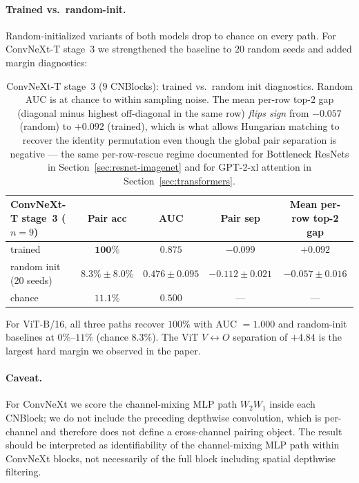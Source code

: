 \documentclass[10pt]{article}
\theoremstyle{remark}
\begin{document}
\paragraph{Trained vs.\ random-init.} Random-initialized variants of both
models drop to chance on every path. For ConvNeXt-T stage~3 we
strengthened the baseline to $20$ random seeds and added margin
diagnostics:

\begin{table}[H]
\centering
\small
\renewcommand{\arraystretch}{1.15}
\begin{tabular}{lcccc}
\toprule
ConvNeXt-T stage~3 ($n{=}9$) & Pair acc & AUC & Pair sep & Mean per-row top-2 gap \\
\midrule
trained                       & $\mathbf{100\%}$ & $0.875$ & $-0.099$ & $\mathbf{+0.092}$ \\
random init (20 seeds)        & $8.3\%\pm 8.0\%$ & $0.476\pm 0.095$ & $-0.112\pm 0.021$ & $-0.057\pm 0.016$ \\
chance                        & $11.1\%$         & $0.500$           & ---     & --- \\
\bottomrule
\end{tabular}
\caption{ConvNeXt-T stage~3 ($9$ CNBlocks): trained vs.\ random init
diagnostics. Random AUC is at chance to within sampling noise. The
mean per-row top-2 gap (diagonal minus highest off-diagonal in the same
row) \emph{flips sign} from $-0.057$ (random) to $+0.092$ (trained),
which is what allows Hungarian matching to recover the identity
permutation even though the global pair separation is negative ---
the same per-row-rescue regime documented for Bottleneck ResNets in
Section~\ref{sec:resnet-imagenet} and for GPT-2-xl attention in
Section~\ref{sec:transformers}.}\label{tab:convnext-baseline}
\end{table}

For ViT-B/16, all three paths recover $100\%$ with AUC $=1.000$ and
random-init baselines at $0\%$--$11\%$ (chance $8.3\%$). The ViT
$V\!\leftrightarrow\!O$ separation of $+4.84$ is the largest hard
margin we observed in the paper.

\paragraph{Caveat.}
For ConvNeXt we score the channel-mixing MLP path $W_2 W_1$ inside each
CNBlock; we do not include the preceding depthwise convolution, which
is per-channel and therefore does not define a cross-channel pairing
object. The result should be interpreted as identifiability of the
channel-mixing MLP path within ConvNeXt blocks, not necessarily of the
full block including spatial depthwise filtering.
\end{document}
